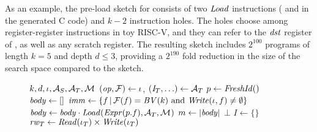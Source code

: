 As an example, the pre-load sketch for  consists of two $\mathit{Load}$
instructions ( and  in the generated C code) and $k-2$
instruction holes.  The holes choose among register-register instructions in toy
RISC-V, and they can refer to the $\mathit{dst}$ register of , as
well as any scratch register. The resulting sketch includes $2^{100}$ programs
of length $k = 5$ and depth $d\leq 3$, providing a $2^{190}$ fold reduction in
the size of the search space compared to the \RW sketch.\tighten

\begin{figure}[H]
  \begin{algorithmic}[1] 
      {$k, d, \iota, \mathcal{A}_S, \mathcal{A}_T, \mathcal{M}_{}$}
      \State $(\mathit{op}, \mathcal{F}) \gets \iota$, $(\mathit{I}_T, \ldots) \gets \mathcal{A}_T$ 
      \State $p \gets \mathit{FreshId}()$ 
      \State $\mathit{body}\gets []$  
      \State $\mathit{imm} \gets \{ f \,|\, \mathcal{F}(f) = \mathit{BV}(k) \text{ and } \mathit{Write}(\iota,f) \neq \emptyset \}$ 
       
        \State $\mathit{body}\gets\mathit{body}\cdot \mathit{Load}(\mathit{Expr}(p.f), \mathcal{A}_T, \mathcal{M}_{})$ 
      \EndFor
      \State $m \gets |\mathit{body}|$ 
       \Return $\bot$ 
      \EndIf
       
        \State $I \gets \{\}$  
           
         \State $\mathit{rw}_T \gets  \mathit{Read}(\iota_T) \times \mathit{Write}(\iota_T)$ 

\end{algorithmic}
\end{figure}
